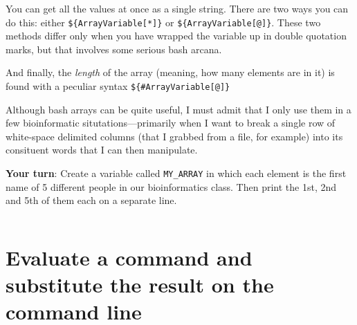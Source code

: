 \documentclass[]{krantz}
\makeatletter
\newenvironment{Shaded}{\begin{snugshade}}{\end{snugshade}}
\newcommand{\BuiltInTok}[1]{#1}
\newcommand{\CommentTok}[1]{\textcolor[rgb]{0.37,0.37,0.37}{\textit{#1}}}
\newcommand{\ExtensionTok}[1]{#1}
\newcommand{\NormalTok}[1]{#1}
\newcommand{\VariableTok}[1]{\textcolor[rgb]{0,0,0}{#1}}
\newenvironment{kframe}{%
\medskip{}
\setlength{\fboxsep}{.8em}
 \def\at@end@of@kframe{}%
 \ifinner\ifhmode%
  \def\at@end@of@kframe{\end{minipage}}%
  \begin{minipage}{\columnwidth}%
 \fi\fi%
 \def\FrameCommand##1{\hskip\@totalleftmargin \hskip-\fboxsep
 \colorbox{shadecolor}{##1}\hskip-\fboxsep
     \hskip-\linewidth \hskip-\@totalleftmargin \hskip\columnwidth}%
 \MakeFramed {\advance\hsize-\width
   \@totalleftmargin\z@ \linewidth\hsize
   \@setminipage}}%
 {\par\unskip\endMakeFramed%
 \at@end@of@kframe}
\renewenvironment{Shaded}{\begin{kframe}}{\end{kframe}}
\makeatother
\begin{document}
You can get all the values at once as a single string. There are two
ways you can do this: either \texttt{\$\{ArrayVariable{[}*{]}\}} or
\texttt{\$\{ArrayVariable{[}@{]}\}}. These two methods differ only when you have wrapped the variable up
in double quotation marks, but that involves some serious bash arcana.

\begin{Shaded}
\end{Shaded}

And finally, the \emph{length} of the array (meaning, how many elements
are in it) is found with a peculiar syntax \texttt{\$\{\#ArrayVariable{[}@{]}\}}

\begin{Shaded}
\end{Shaded}

Although bash arrays can be quite useful, I must admit that I only
use them in a few bioinformatic situtations---primarily when I want
to break a single row of white-space delimited columns (that I grabbed
from a file, for example) into its consituent words that I can
then manipulate.

\textbf{Your turn}: Create a variable called \texttt{MY\_ARRAY} in which each
element is the first name of 5 different people in our bioinformatics class.
Then print the 1st, 2nd and 5th of them each on a separate line.

\begin{verbatim}
\end{verbatim}

\hypertarget{evaluate-a-command-and-substitute-the-result-on-the-command-line}{%
\section{Evaluate a command and substitute the result on the command line}\label{evaluate-a-command-and-substitute-the-result-on-the-command-line}}
\end{document}
